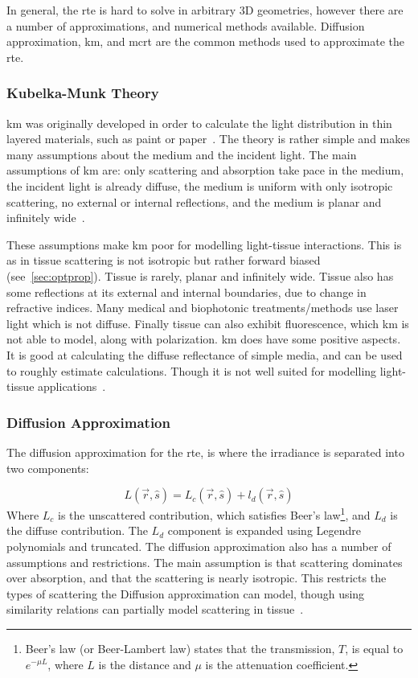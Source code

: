 In general, the \gls*{rte} is hard to solve in arbitrary 3D geometries, however there are a number of approximations, and numerical methods available. Diffusion approximation, \gls*{km}, and \gls*{mcrt} are the common methods used to approximate the \gls*{rte}.

\subsubsection*{Kubelka-Munk Theory}
\gls*{km} was originally developed in order to calculate the light distribution in thin layered materials, such as paint or paper~\cite{barbaric2011kubelka}. The theory is rather simple and makes many assumptions about the medium and the incident light. The main assumptions of \gls*{km} are: only scattering and absorption take pace in the medium, the incident light is already diffuse, the medium is uniform with only isotropic scattering, no external or internal reflections, and the medium is planar and infinitely wide~\cite{jasinski2011modelling,cheong1990review,gabriela2013mathematical}.

These assumptions make \gls*{km} poor for modelling light-tissue interactions. This is as in tissue scattering is not isotropic but rather forward biased (see~\cref{sec:optprop}). Tissue is rarely, planar and infinitely wide. Tissue also has some reflections at its external and internal boundaries, due to change in refractive indices. Many medical and biophotonic treatments/methods use laser light which is not diffuse. Finally tissue can also exhibit fluorescence, which \gls*{km} is not able to model, along with polarization. 
\gls*{km} does have some positive aspects. It is good at calculating the diffuse reflectance of simple media, and can be used to roughly estimate calculations. Though it is not well suited for modelling light-tissue applications~\cite{prahl1990light}.

\subsubsection*{Diffusion Approximation}
The diffusion approximation for the \gls*{rte}, is where the irradiance is separated into two components:

\begin{equation}
	L(\vec{r},\hat{s}) = L_c(\vec{r},\hat{s}) +l_d(\vec{r},\hat{s})
\end{equation}
Where $L_c$ is the unscattered contribution, which satisfies Beer's law\footnote{Beer's law (or Beer-Lambert law) states that the transmission, $T$, is equal to $e^{-\mu L}$, where $L$ is the distance and $\mu$ is the attenuation coefficient.}, and $L_d$ is the diffuse contribution. The $L_d$ component is expanded using Legendre polynomials and truncated. 
The diffusion approximation also has a number of assumptions and restrictions. The main assumption is that scattering dominates over absorption, and that the scattering is nearly isotropic. This restricts the types of scattering the Diffusion approximation can model, though using similarity relations can partially model scattering in tissue~\cite{graaff1993similarity,yoon1989accuracies}.

